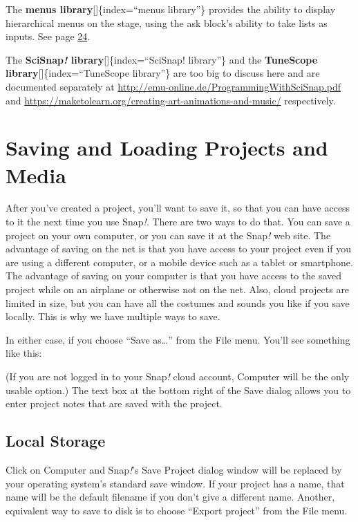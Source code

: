 \documentclass[
  letterpaper,
]{book}
\begin{document}
The \textbf{menus library}{[}{]}\{index=``menus library''\} provides the
ability to display hierarchical menus on the stage, using the ask
block's ability to take lists as inputs. See page
\hyperref[ask_lists]{24}.

The \textbf{SciSnap\emph{!} library}{[}{]}\{index=``SciSnap! library''\}
and the \textbf{TuneScope library}{[}{]}\{index=``TuneScope library''\}
are too big to discuss here and are documented separately at
\url{http://emu-online.de/ProgrammingWithSciSnap.pdf} and
\url{https://maketolearn.org/creating-art-animations-and-music/}
respectively.


\chapter{Saving and Loading Projects and
Media}\label{saving-and-loading-projects-and-media}

After you've created a project, you'll want to save it, so that you can
have access to it the next time you use Snap\emph{!}. There are two ways
to do that. You can save a project on your own computer, or you can save
it at the Snap\emph{!} web site. The advantage of saving on the net is
that you have access to your project even if you are using a different
computer, or a mobile device such as a tablet or smartphone. The
advantage of saving on your computer is that you have access to the
saved project while on an airplane or otherwise not on the net. Also,
cloud projects are limited in size, but you can have all the costumes
and sounds you like if you save locally. This is why we have multiple
ways to save.

\label{saveas}{}In either case, if you choose ``Save
as\ldots{}'' from the File menu. You'll see something like this:

(If you are not logged in to your Snap\emph{!} cloud account, Computer
will be the only usable option.) The text box at the bottom right of the
Save dialog allows you to enter project notes that are saved with the
project.

\section{Local Storage}\label{local-storage}

Click on Computer and Snap\emph{!}'s Save Project dialog window will be
replaced by your operating system's standard save window. If your
project has a name, that name will be the default filename if you don't
give a different name. Another, equivalent way to save to disk is to
choose ``Export project'' from the File menu.
\end{document}
